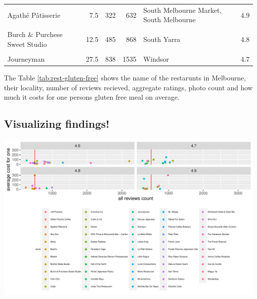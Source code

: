 \documentclass[11pt,a4paper,]{article}
\let\origfigure\figure
\let\endorigfigure\endfigure
\renewenvironment{figure}[1][2] {
    \expandafter\origfigure\expandafter[H]
} {
    \endorigfigure
}%
\begin{document}
\begin{table}[!h]
\begin{tabular}[t]{l|r|r|r|l|l}
\hline
\cellcolor{gray!6}{Bibelot} & \cellcolor{gray!6}{15.0} & \cellcolor{gray!6}{428} & \cellcolor{gray!6}{1437} & \cellcolor{gray!6}{South Melbourne} & \cellcolor{gray!6}{4.8}\\
\hline
Agathé Pâtisserie & 7.5 & 322 & 632 & South Melbourne Market, South Melbourne & 4.9\\
\hline
\cellcolor{gray!6}{Wagyu Ya} & \cellcolor{gray!6}{75.0} & \cellcolor{gray!6}{395} & \cellcolor{gray!6}{1625} & \cellcolor{gray!6}{South Yarra} & \cellcolor{gray!6}{4.7}\\
\hline
Burch \& Purchese Sweet Studio & 12.5 & 485 & 868 & South Yarra & 4.8\\
\hline
\cellcolor{gray!6}{Mr. Miyagi} & \cellcolor{gray!6}{40.0} & \cellcolor{gray!6}{908} & \cellcolor{gray!6}{2311} & \cellcolor{gray!6}{Windsor} & \cellcolor{gray!6}{4.7}\\
\hline
Journeyman & 27.5 & 838 & 1535 & Windsor & 4.7\\
\hline
\end{tabular}
\end{table}

The Table \ref{tab:rest-gluten-free} shows the name of the restarunts in Melbourne, their locality, number of reviews recieved, aggregate ratings, photo count and how much it costs for one persons gluten free meal on average.

\hypertarget{visualizing-findings}{%
\subsection{Visualizing findings!}\label{visualizing-findings}}

\begin{figure}[H]

{\centering \includegraphics{assignment4_files/figure-latex/review-price-relation-1} 

}

\caption{Worth the money!}\label{fig:review-price-relation}
\end{figure}
\end{document}
